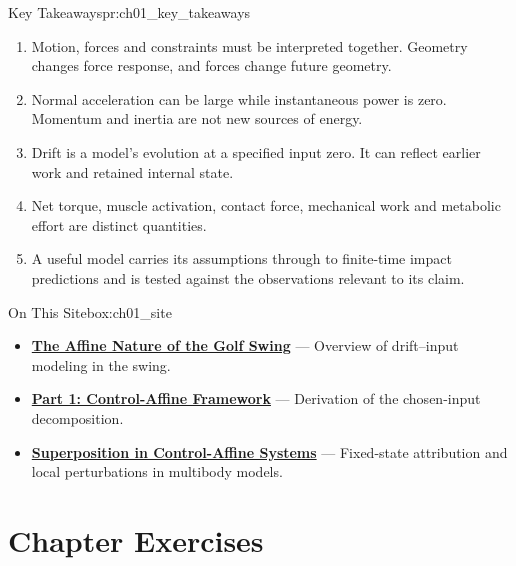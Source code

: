 \begin{principle}{Key Takeaways}{pr:ch01_key_takeaways}

\begin{enumerate}
\def\labelenumi{\arabic{enumi}.}

\item
  Motion, forces and constraints must be interpreted together. Geometry changes force response, and forces change future geometry.
\item
  Normal acceleration can be large while instantaneous power is zero. Momentum and inertia are not new sources of energy.
\item
  Drift is a model's evolution at a specified input zero. It can reflect earlier work and retained internal state.
\item
  Net torque, muscle activation, contact force, mechanical work and metabolic effort are distinct quantities.
\item
  A useful model carries its assumptions through to finite-time impact predictions and is tested against the observations relevant to its claim.
\end{enumerate}

\end{principle}

\begin{laymansbox}{On This Site}{box:ch01_site}

\begin{itemize}

\item
  \textbf{\href{https://affinedrift.com/articles/affine-nature-golf-swing.html}{The Affine Nature of the Golf Swing}} --- Overview of drift--input modeling in the swing.
\item
  \textbf{\href{https://affinedrift.com/articles/theory-part1.html}{Part 1: Control-Affine Framework}} --- Derivation of the chosen-input decomposition.
\item
  \textbf{\href{https://affinedrift.com/articles/superposition.html}{Superposition in Control-Affine Systems}} --- Fixed-state attribution and local perturbations in multibody models.
\end{itemize}

\end{laymansbox}

\section{Chapter Exercises}\label{ch01:chapter-exercises}

